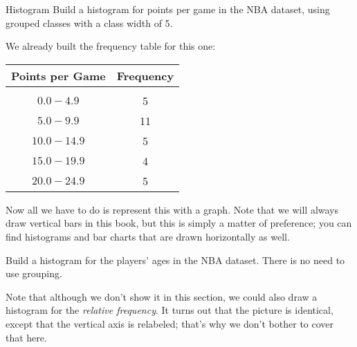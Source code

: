 \begin{example}{Histogram}
Build a histogram for points per game in the NBA dataset, using grouped classes with a class width of 5.

\sol
We already built the frequency table for this one:
\begin{center}
\begin{tabular}{c c}
\textbf{Points per Game} & \textbf{Frequency}\\
\hline
& \\
$0.0 - 4.9$ & 5\\
$5.0 - 9.9$ & 11\\
$10.0 - 14.9$ & 5\\
$15.0 - 19.9$ & 4\\
$20.0 - 24.9$ & 5
\end{tabular}
\end{center}
Now all we have to do is represent this with a graph.  Note that we will always draw vertical bars in this book, but this is simply a matter of preference; you can find histograms and bar charts that are drawn horizontally as well.
\begin{center}
\end{center}
\end{example}

\begin{try}
Build a histogram for the players' ages in the NBA dataset.  There is no need to use grouping.
\end{try}

Note that although we don't show it in this section, we could also draw a histogram for the \emph{relative frequency}.  It turns out that the picture is identical, except that the vertical axis is relabeled; that's why we don't bother to cover that here.

